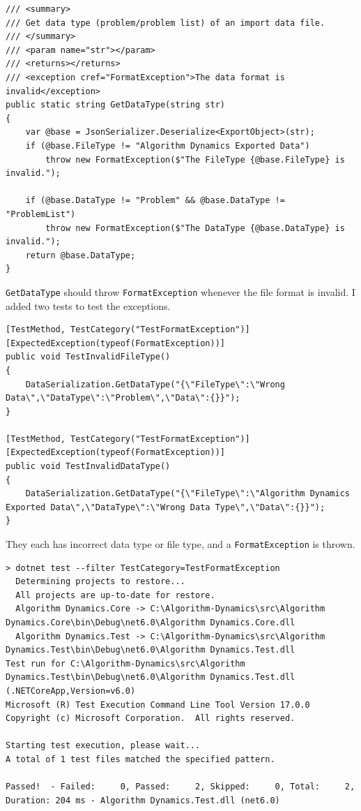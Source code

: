 \documentclass[a4paper]{report}
\newcommand{\code}{\texttt}
\begin{document}
\begin{verbatim}
/// <summary>
/// Get data type (problem/problem list) of an import data file.
/// </summary>
/// <param name="str"></param>
/// <returns></returns>
/// <exception cref="FormatException">The data format is invalid</exception>
public static string GetDataType(string str)
{
    var @base = JsonSerializer.Deserialize<ExportObject>(str);
    if (@base.FileType != "Algorithm Dynamics Exported Data")
        throw new FormatException($"The FileType {@base.FileType} is invalid.");

    if (@base.DataType != "Problem" && @base.DataType != "ProblemList")
        throw new FormatException($"The DataType {@base.DataType} is invalid.");
    return @base.DataType;
}
\end{verbatim}

\code{GetDataType} should throw \code{FormatException} whenever the file format is invalid. I added two tests to test the exceptions.

\begin{verbatim}
[TestMethod, TestCategory("TestFormatException")]
[ExpectedException(typeof(FormatException))]
public void TestInvalidFileType()
{
    DataSerialization.GetDataType("{\"FileType\":\"Wrong Data\",\"DataType\":\"Problem\",\"Data\":{}}");
}

[TestMethod, TestCategory("TestFormatException")]
[ExpectedException(typeof(FormatException))]
public void TestInvalidDataType()
{
    DataSerialization.GetDataType("{\"FileType\":\"Algorithm Dynamics Exported Data\",\"DataType\":\"Wrong Data Type\",\"Data\":{}}");
}
\end{verbatim}

They each has incorrect data type or file type, and a \code{FormatException} is thrown.

\begin{verbatim}
> dotnet test --filter TestCategory=TestFormatException
  Determining projects to restore...
  All projects are up-to-date for restore.
  Algorithm Dynamics.Core -> C:\Algorithm-Dynamics\src\Algorithm Dynamics.Core\bin\Debug\net6.0\Algorithm Dynamics.Core.dll
  Algorithm Dynamics.Test -> C:\Algorithm-Dynamics\src\Algorithm Dynamics.Test\bin\Debug\net6.0\Algorithm Dynamics.Test.dll
Test run for C:\Algorithm-Dynamics\src\Algorithm Dynamics.Test\bin\Debug\net6.0\Algorithm Dynamics.Test.dll (.NETCoreApp,Version=v6.0)
Microsoft (R) Test Execution Command Line Tool Version 17.0.0
Copyright (c) Microsoft Corporation.  All rights reserved.

Starting test execution, please wait...
A total of 1 test files matched the specified pattern.

Passed!  - Failed:     0, Passed:     2, Skipped:     0, Total:     2, Duration: 204 ms - Algorithm Dynamics.Test.dll (net6.0)
\end{verbatim}
\end{document}
